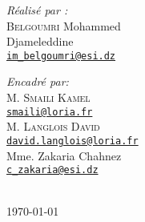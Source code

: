 {\begin{titlepage}
  \noindent
  \begin{minipage}{0.6\textwidth}
      \vspace{-7mm}
    \begin{flushleft} \large
      \emph{Réalisé par :}\\
      \textsc{Belgoumri} Mohammed \\Djameleddine\\
      \href{mailto:im_belgoumri@esi.dz}{\texttt{im\_belgoumri@esi.dz}}
      
    \end{flushleft}
  \end{minipage}
  \begin{minipage}{0.3\textwidth}
    \begin{flushright} \large
      \begin{flushleft} \large
      \emph{Encadré par:} \\
      {
        M. \textsc{Smaili Kamel}\\[0.1cm]
        \href{mailto:smaili@loria.fr}{\texttt{smaili@loria.fr}}\\[0.1cm]
        M. \textsc{Langlois David}\\[0.1cm]
        \href{mailto:david.langlois@loria.fr}{\texttt{david.langlois@loria.fr}}\\[0.1cm]
        Mme. Zakaria Chahnez\\[0.1cm]
        \href{mailto:c_zakaria@esi.dz}{\texttt{c\_zakaria@esi.dz}}\\
      }
      \end{flushleft}

    \end{flushright}
  \end{minipage}\\[1cm]

  
  \vfill
  {\large \today}        
  \end{titlepage}
  \restoregeometry
}